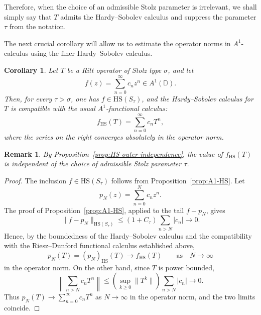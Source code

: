 \documentclass[11pt]{amsart}
\numberwithin{equation}{section}
\newtheorem{corollary}[theorem]{Corollary}
\newtheorem{remark}[theorem]{Remark}
\theoremstyle{definition}
\theoremstyle{plain}
\def\D{\mathbb{D}}
\newcommand{\HS}{\mathrm{HS}}
\begin{document}
 Therefore, when the choice of an admissible Stolz parameter is irrelevant, we shall simply say that \(T\) admits the Hardy--Sobolev calculus and suppress the parameter \(\tau\) from the notation.


The next crucial corollary will allow us to estimate the operator norms
in $A^1$-calculus using the finer Hardy--Sobolev calculus.


\begin{corollary}\label{cor:A1-compatibility}
Let \(T\) be a Ritt operator of Stolz type \(\sigma\), and let
\[
        f(z)=\sum_{n=0}^\infty c_nz^n\in A^1(\D).
\]
Then, for every \(\tau>\sigma\), one has \(f\in\HS(S_\tau)\), and the
Hardy--Sobolev calculus for \(T\) is compatible with the usual
\(A^1\)-functional calculus:
\[
        f_{\HS}(T)=\sum_{n=0}^\infty c_nT^n,
\]
where the series on the right converges absolutely in the operator norm.
\end{corollary}

\begin{remark}
By Proposition~\ref{prop:HS-outer-independence}, the value of \(f_{\HS}(T)\)
is independent of the choice of admissible Stolz parameter $\tau$.
\end{remark}

\begin{proof}
The inclusion \(f\in\HS(S_\tau)\) follows from
Proposition~\ref{prop:A1-HS}.  Let
\[
        p_N(z)=\sum_{n=0}^N c_nz^n .
\]
The proof of Proposition~\ref{prop:A1-HS}, applied to the tail
\(f-p_N\), gives
\[
        \|f-p_N\|_{\HS(S_\tau)}
        \le (1+C_\tau)\sum_{n>N}|c_n|
        \to 0 .
\]
Hence, by the boundedness of the Hardy--Sobolev calculus and the compatibility with the Riesz--Dunford functional calculus established above,
\[
        p_N(T)=(p_N)_{\HS}(T)\longrightarrow f_{\HS}(T) \qquad \text{as} \quad N \to \infty
\]
in the operator norm.  On the other hand, since \(T\) is power bounded,
\[
        \left\|\sum_{n>N}c_nT^n\right\|
        \le
        \left(\sup_{k\ge0}\|T^k\|\right)
        \sum_{n>N}|c_n|
        \longrightarrow0 .
\]
Thus \(p_N(T)\to\sum_{n=0}^\infty c_nT^n\) as $N \to \infty$ in the operator norm, and the two
limits coincide.
\end{proof}
\end{document}
